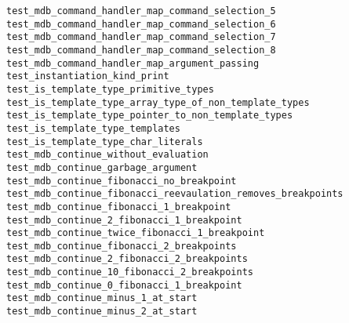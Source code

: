 \begin{description}
    \item[\texttt{test\_mdb\_command\_handler\_map\_command\_selection\_5}]
    \item[\texttt{test\_mdb\_command\_handler\_map\_command\_selection\_6}]
    \item[\texttt{test\_mdb\_command\_handler\_map\_command\_selection\_7}]
    \item[\texttt{test\_mdb\_command\_handler\_map\_command\_selection\_8}]
    \item[\texttt{test\_mdb\_command\_handler\_map\_argument\_passing}]
    \item[\texttt{test\_instantiation\_kind\_print}]
    \item[\texttt{test\_is\_template\_type\_primitive\_types}]
    \item[\texttt{test\_is\_template\_type\_array\_type\_of\_non\_template\_types}]
    \item[\texttt{test\_is\_template\_type\_pointer\_to\_non\_template\_types}]
    \item[\texttt{test\_is\_template\_type\_templates}]
    \item[\texttt{test\_is\_template\_type\_char\_literals}]
    \item[\texttt{test\_mdb\_continue\_without\_evaluation}]
    \item[\texttt{test\_mdb\_continue\_garbage\_argument}]
    \item[\texttt{test\_mdb\_continue\_fibonacci\_no\_breakpoint}]
    \item[\texttt{test\_mdb\_continue\_fibonacci\_reevaulation\_removes\_breakpoints}]
    \item[\texttt{test\_mdb\_continue\_fibonacci\_1\_breakpoint}]
    \item[\texttt{test\_mdb\_continue\_2\_fibonacci\_1\_breakpoint}]
    \item[\texttt{test\_mdb\_continue\_twice\_fibonacci\_1\_breakpoint}]
    \item[\texttt{test\_mdb\_continue\_fibonacci\_2\_breakpoints}]
    \item[\texttt{test\_mdb\_continue\_2\_fibonacci\_2\_breakpoints}]
    \item[\texttt{test\_mdb\_continue\_10\_fibonacci\_2\_breakpoints}]
    \item[\texttt{test\_mdb\_continue\_0\_fibonacci\_1\_breakpoint}]
    \item[\texttt{test\_mdb\_continue\_minus\_1\_at\_start}]
    \item[\texttt{test\_mdb\_continue\_minus\_2\_at\_start}]

\end{description}
